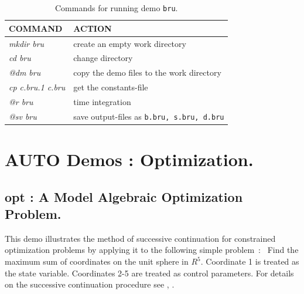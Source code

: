 \documentclass[12pt]{report}
\begin{document}
\begin{table}[htbp]
\begin{center}
\begin{tabular}{| l | l |}
\hline
  COMMAND  & ACTION \\
\hline
  {\it mkdir bru} & create an empty work directory \\ 
  {\it cd bru} & change directory \\
  {\it @dm bru} & copy the demo files to the work directory \\
\hline
  {\it cp c.bru.1 c.bru} & get the constants-file \\ 
  {\it @r bru} & time integration \\ 
  {\it @sv bru} & save output-files as {\tt b.bru, s.bru, d.bru} \\ 
\hline
\end{tabular}
\caption{Commands for running demo {\tt bru}.}
\label{tbl:demo_bru}
\end{center}
\end{table}

\chapter{ {\cal AUTO} Demos : Optimization.} \label{ch:Demos_Opt}

\newpage
\section{ opt : A Model Algebraic Optimization Problem.} \label{sec:Demos_opt}
This demo illustrates the method of successive continuation 
for constrained optimization problems 
 by applying it to the following
simple problem~:~
Find the
maximum sum of coordinates on the unit sphere in $R^{5}$.
Coordinate 1 is treated as the state variable.
Coordinates 2-5 are treated as control parameters.
For details on the successive continuation procedure
see   \citeyear{DoKeKe:91a},
 \citeyear{DoKeKe:91b}.
\end{document}
